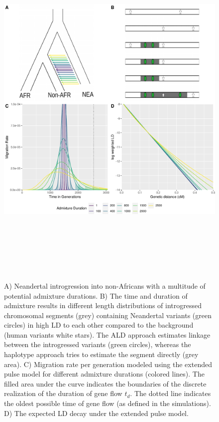 \documentclass[11pt]{article}
\begin{document}
\begin{figure}
\centering
\includegraphics[width=16cm,height=18cm,keepaspectratio]{Admixture_Time_Inference_Paper_Draft_files/figure-latex/fig1-1.pdf}
\caption{\label{fig:fig1} A) Neandertal introgression into non-Africans with a multitude of potential admixture durations. B) The time and duration of admixture results in different length distributions of introgressed chromosomal segments (grey) containing  Neandertal variants (green circles)  in high LD to each other
compared to the background (human variants white stars). The ALD approach estimates linkage
between the introgressed variants (green circles), whereas the haplotype approach tries
to estimate the segment directly (grey area). C) Migration rate per generation
modeled using the extended pulse model for different admixture durations (colored lines). The filled area under the curve indicates the boundaries of the discrete realization of the duration of gene flow $t_d$.
The dotted line indicates the oldest possible time of gene flow (as defined in the simulations). D) The expected LD decay under the extended pulse model.}
\end{figure}
\end{document}
